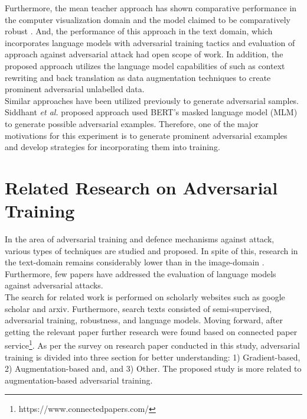 \documentclass[%
	BCOR=8mm, %
	DIV=12,
	toc=bibliography, %
	toc=listof, %
	oneside, %
	egregdoesnotlikesansseriftitles, %
	]{scrbook}
\begin{document}
Furthermore, the mean teacher approach has shown comparative performance in the computer visualization domain and the model claimed to be comparatively robust \cite{tarvainen_mean_2018}. And, the performance of this approach in the text domain, which incorporates language models with adversarial training tactics  and evaluation of approach against adversarial attack had open scope of work. In addition, the proposed approach utilizes the language model capabilities of such as context rewriting and back translation as data augmentation techniques to create prominent adversarial unlabelled data. \\
Similar approaches have been utilized previously to generate adversarial samples. Siddhant \textit{et al.}  \cite{garg_bae_2020}  proposed approach used BERT's masked language model (MLM) to generate possible adversarial examples. Therefore, one of the major motivations for this experiment is to generate prominent adversarial examples and develop strategies for incorporating them into training.

\chapter{Related Research on Adversarial Training}
\label{chapter:relatedwork}
In the area of adversarial training and defence mechanisms against attack, various types of techniques are studied and proposed. In spite of this, research in the text-domain remains considerably lower than in the image-domain \cite{wang_towards_2021}. Furthermore, few papers have addressed the evaluation of language models against adversarial attacks.\\
The search for related work is performed on scholarly websites such as google scholar and arxiv. Furthermore, search texts consisted of semi-supervised, adversarial training, robustness, and language models. Moving forward,  after getting the relevant paper further research were found based on connected paper service\footnote{https://www.connectedpapers.com/}.
As per the survey on research paper conducted in this study, adversarial training is divided into three section for better understanding: 1) Gradient-based, 2) Augmentation-based and, and 3) Other. The proposed study is more related to augmentation-based adversarial training.
\end{document}
